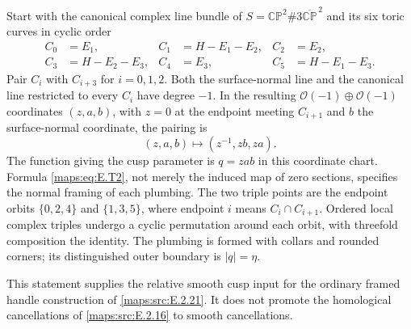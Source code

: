 \begin{proposition}
Start with the canonical complex line bundle of
$S=\mathbb {CP}^2\#3\overline{\mathbb {CP}}^{\,2}$ and its six
toric curves in cyclic order
\[
 \begin{aligned}
 C_0&=E_1,& C_1&=H-E_1-E_2,& C_2&=E_2,\\
 C_3&=H-E_2-E_3,& C_4&=E_3,& C_5&=H-E_1-E_3.
 \end{aligned}
 \tag{E.T1}\label{maps:eq:E.T1}
\]
Pair $C_i$ with $C_{i+3}$ for $i=0,1,2$.  Both the surface-normal
line and the canonical line restricted to every $C_i$ have degree
$-1$.  In the resulting $\mathcal O(-1)\oplus\mathcal O(-1)$
coordinates $(z,a,b)$, with $z=0$ at the endpoint meeting
$C_{i+1}$ and $b$ the surface-normal coordinate, the pairing is
\[
             (z,a,b)\longmapsto(z^{-1},zb,za).
 \tag{E.T2}\label{maps:eq:E.T2}
\]
The function giving the cusp parameter is $q=zab$ in this
coordinate chart.  Formula \eqref{maps:eq:E.T2}, not merely the induced map
of zero sections, specifies the normal framing of each plumbing.
The two triple points are the endpoint orbits
$\{0,2,4\}$ and $\{1,3,5\}$, where endpoint $i$ means
$C_i\cap C_{i+1}$.  Ordered local complex triples undergo a
cyclic permutation around each orbit, with threefold composition
the identity.  The plumbing is formed with collars and rounded
corners; its distinguished outer boundary is $|q|=\eta$.

This statement supplies the relative smooth cusp input for the
ordinary framed handle construction of \ref{maps:src:E.2.21}.  It does not
promote the homological cancellations of \ref{maps:src:E.2.16} to smooth
cancellations.

\end{proposition}


